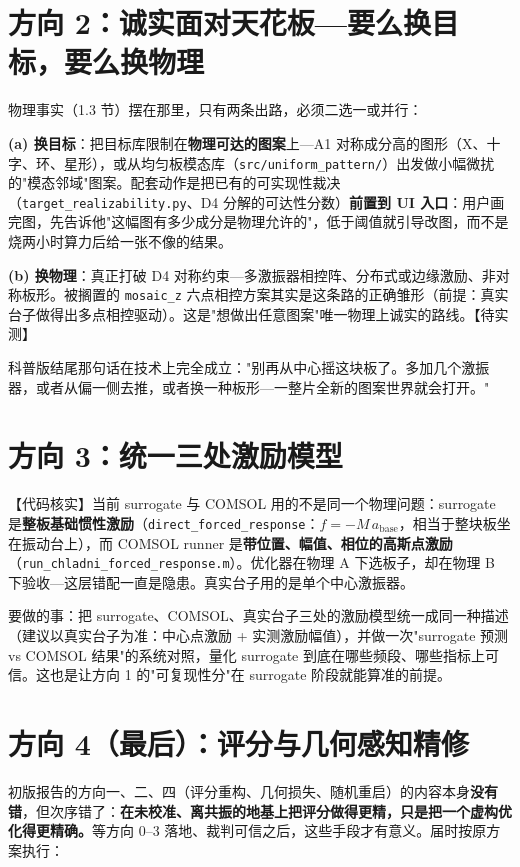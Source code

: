 \documentclass[11pt,a4paper]{article}
\newcommand{\code}[1]{\texttt{#1}}
\begin{document}
\section{方向 2：诚实面对天花板---要么换目标，要么换物理}

物理事实（1.3 节）摆在那里，只有两条出路，必须二选一或并行：

\textbf{(a) 换目标}：把目标库限制在\textbf{物理可达的图案}上---A1 对称成分高的图形（X、十字、环、星形），或从均匀板模态库（\code{src/uniform\_pattern/}）出发做小幅微扰的"模态邻域"图案。配套动作是把已有的可实现性裁决（\code{target\_realizability.py}、D4 分解的可达性分数）\textbf{前置到 UI 入口}：用户画完图，先告诉他"这幅图有多少成分是物理允许的"，低于阈值就引导改图，而不是烧两小时算力后给一张不像的结果。

\textbf{(b) 换物理}：真正打破 D4 对称约束---多激振器相控阵、分布式或边缘激励、非对称板形。被搁置的 \code{mosaic\_z} 六点相控方案其实是这条路的正确雏形（前提：真实台子做得出多点相控驱动）。这是"想做出任意图案"唯一物理上诚实的路线。【待实测】

科普版结尾那句话在技术上完全成立："别再从中心摇这块板了。多加几个激振器，或者从偏一侧去推，或者换一种板形---一整片全新的图案世界就会打开。"

\section{方向 3：统一三处激励模型}

【代码核实】当前 surrogate 与 COMSOL 用的不是同一个物理问题：surrogate 是\textbf{整板基础惯性激励}（\code{direct\_forced\_response}：$f=-M\,a_{\mathrm{base}}$，相当于整块板坐在振动台上），而 COMSOL runner 是\textbf{带位置、幅值、相位的高斯点激励}（\code{run\_chladni\_forced\_response.m}）。优化器在物理 A 下选板子，却在物理 B 下验收---这层错配一直是隐患。真实台子用的是单个中心激振器。

要做的事：把 surrogate、COMSOL、真实台子三处的激励模型统一成同一种描述（建议以真实台子为准：中心点激励 + 实测激励幅值），并做一次"surrogate 预测 vs COMSOL 结果"的系统对照，量化 surrogate 到底在哪些频段、哪些指标上可信。这也是让方向 1 的"可复现性分"在 surrogate 阶段就能算准的前提。

\section{方向 4（最后）：评分与几何感知精修}

初版报告的方向一、二、四（评分重构、几何损失、随机重启）的内容本身\textbf{没有错}，但次序错了：\textbf{在未校准、离共振的地基上把评分做得更精，只是把一个虚构优化得更精确。}等方向 0--3 落地、裁判可信之后，这些手段才有意义。届时按原方案执行：
\end{document}
